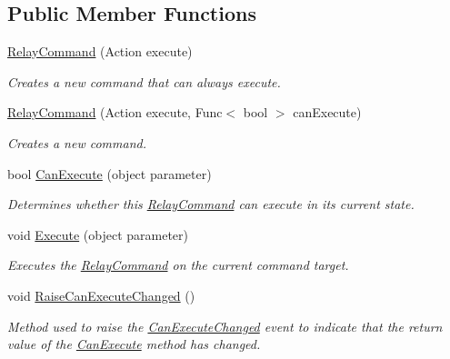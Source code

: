 \subsection*{Public Member Functions}
\begin{DoxyCompactItemize}
\item 
\hyperlink{class__1aarsproeve_1_1_common_1_1_relay_command_ab592bbed4e6cfd1559dcaffe23223a13}{Relay\+Command} (Action execute)
\begin{DoxyCompactList}\small\item\em Creates a new command that can always execute. \end{DoxyCompactList}\item 
\hyperlink{class__1aarsproeve_1_1_common_1_1_relay_command_a29a92428317c491efba524c871cce065}{Relay\+Command} (Action execute, Func$<$ bool $>$ can\+Execute)
\begin{DoxyCompactList}\small\item\em Creates a new command. \end{DoxyCompactList}\item 
bool \hyperlink{class__1aarsproeve_1_1_common_1_1_relay_command_a3c52d00e1d9ab7ab06cc4244b50fbee2}{Can\+Execute} (object parameter)
\begin{DoxyCompactList}\small\item\em Determines whether this \hyperlink{class__1aarsproeve_1_1_common_1_1_relay_command}{Relay\+Command} can execute in its current state. \end{DoxyCompactList}\item 
void \hyperlink{class__1aarsproeve_1_1_common_1_1_relay_command_a0958a03842d5de3567d9e644026046b3}{Execute} (object parameter)
\begin{DoxyCompactList}\small\item\em Executes the \hyperlink{class__1aarsproeve_1_1_common_1_1_relay_command}{Relay\+Command} on the current command target. \end{DoxyCompactList}\item 
void \hyperlink{class__1aarsproeve_1_1_common_1_1_relay_command_a90744bca5c47a6c212fd7d0cb89182f1}{Raise\+Can\+Execute\+Changed} ()
\begin{DoxyCompactList}\small\item\em Method used to raise the \hyperlink{class__1aarsproeve_1_1_common_1_1_relay_command_a4502fa3e74d23cc9cd33cec559e96390}{Can\+Execute\+Changed} event to indicate that the return value of the \hyperlink{class__1aarsproeve_1_1_common_1_1_relay_command_a3c52d00e1d9ab7ab06cc4244b50fbee2}{Can\+Execute} method has changed. \end{DoxyCompactList}\end{DoxyCompactItemize}
